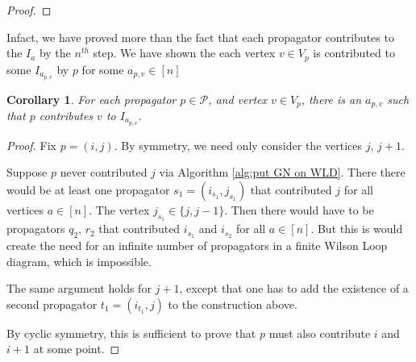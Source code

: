 \documentclass[11pt]{article}
\newcommand{\drawprop}[4]{
\pgfmathsetmacro{\r}{#1}
\pgfmathsetmacro{\bumpr}{#2}
\pgfmathsetmacro{\s}{#3}
\pgfmathsetmacro{\bumps}{#4}
\pgfmathsetmacro{\perturbe}{\angle/\n}

\begin{scope}
\clip (\angle*\r:\radius) -- (\angle + \angle*\r:\radius) -- (\angle*\s:\radius) -- (\angle + \angle*\s:\radius) -- (\angle*\r:\radius);
\draw[propagator] (\angle*\r + \angle/2 + \bumpr*\perturbe:\radius) -- (\angle*\s + \angle/2 + \bumps*\perturbe:\radius);
\end{scope}
}
\newcommand{\cP}{\mathcal{P}}
\newtheorem{cor}[thm]{Corollary}
\theoremstyle{remark}
\theoremstyle{definition}
\begin{document}
\begin{proof}

\end{proof}

Infact, we have proved more than the fact that each propagator contributes to the $I_a$ by the $n^{th}$ step. We have shown the each vertex $v \in V_p$ is contributed to some $I_{a_{p,v}}$ by $p$ for some $a_{p,v} \in [n]$

\begin{cor}\label{every vertex contributed cor}
For each propagator $p \in \cP$, and vertex $v \in V_p$, there is an $a_{p,v}$ such that $p$ contributes $v$ to $I_{a_{p,v}}$.
\end{cor}

\begin{proof}
Fix $p = (i, j)$. By symmetry, we need only consider the vertices $j$, $j+1$.

Suppose $p$ never contributed $j$ via Algorithm \ref{alg:put GN on WLD}. There there would be at least one propagator $s_1 = (i_{s_1}, j_{s_1})$ that contributed $j$ for all vertices $a \in [n]$. The vertex $j_{s_1} \in \{j, j-1\}$. Then there would have to be propagators $q_2$, $r_2$ that contributed $i_{s_1}$ and $i_{s_2}$ for all $a \in [n]$. But this is would create the need for an infinite number of propagators in a finite Wilson Loop diagram, which is impossible.

The same argument holds for $j+1$, except that one has to add the existence of a second propagator $t_1 = (i_{t_1}, j)$ to the construction above.

By cyclic symmetry, this is sufficient to prove that $p$ must also contribute $i$ and $i+1$ at some point.

\end{proof}
\end{document}
